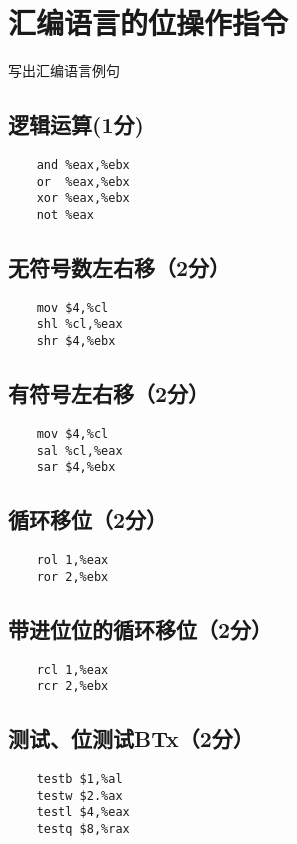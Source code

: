 \section{汇编语言的位操作指令}
\begin{center}
    写出汇编语言例句
\end{center}

\subsection{逻辑运算(1分)}
\begin{lstlisting}
    and %eax,%ebx
    or  %eax,%ebx
    xor %eax,%ebx
    not %eax
\end{lstlisting}

\subsection{无符号数左右移（2分）}
\begin{lstlisting}
    mov $4,%cl
    shl %cl,%eax
    shr $4,%ebx
\end{lstlisting}

\subsection{有符号左右移（2分）}
\begin{lstlisting}
    mov $4,%cl
    sal %cl,%eax
    sar $4,%ebx
\end{lstlisting}

\subsection{循环移位（2分）}
\begin{lstlisting}
    rol 1,%eax
    ror 2,%ebx
\end{lstlisting}

\subsection{带进位位的循环移位（2分）}
\begin{lstlisting}
    rcl 1,%eax
    rcr 2,%ebx
\end{lstlisting}

\subsection{测试、位测试BTx（2分）}
\begin{lstlisting}
    testb $1,%al
    testw $2.%ax
    testl $4,%eax
    testq $8,%rax
\end{lstlisting}


